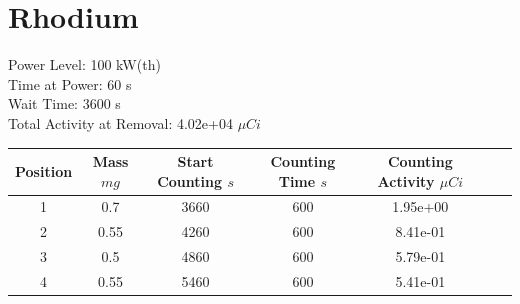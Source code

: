 \newpage

\section*{ Rhodium }

Power Level: 100 kW(th) \\
Time at Power: 60 s \\
Wait Time: 3600 s \\
Total Activity at Removal: 4.02e+04 $\mu Ci$

\begin{table}[h]
\centering
\begin{tabular}{ |c|c|c|c|c|c|c| }
 \hline
 Position & Mass $mg$ & Start Counting $s$ & Counting Time $s$ & Counting Activity $\mu Ci$ \\
 \hline 
 1 & 0.7 & 3660 & 600 & 1.95e+00\\ 
\hline
 2 & 0.55 & 4260 & 600 & 8.41e-01\\ 
\hline
 3 & 0.5 & 4860 & 600 & 5.79e-01\\ 
\hline
 4 & 0.55 & 5460 & 600 & 5.41e-01\\ 
\hline
\end{tabular}
\end{table}

\begin{figure}[!ht]
   \centering
   \quad
   \\ 
   \quad 

\end{figure}

